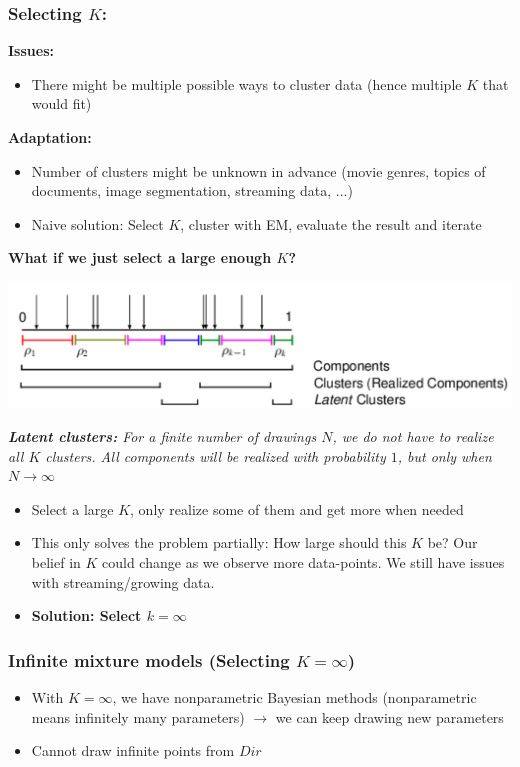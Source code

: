 \subsubsection{Selecting $K$: }
\textbf{Issues: }
\begin{itemize}
	\item There might be multiple possible ways to cluster data (hence multiple $K$ that would fit)
\end{itemize}

\textbf{Adaptation: }
\begin{itemize}
	\item Number of clusters might be unknown in advance (movie genres, topics of documents, image segmentation, streaming data, ...)
	\item Naive solution: Select $K$, cluster with EM, evaluate the result and iterate
\end{itemize}

\textbf{What if we just select a large enough $K$? }

\begin{minipage}{\columnwidth}
	\begin{center}
		\includegraphics[width=\columnwidth]{images/12b-latent-clusters}
	\end{center}
	\textit{\textbf{Latent clusters: }For a finite number of drawings $N$, we do not have to realize all $K$ clusters. All components will be realized with probability $1$, but only when $N\to\infty$}
\end{minipage}

\begin{itemize}
	\item Select a large $K$, only realize some of them and get more when needed
	\item This only solves the problem partially: How large should this $K$ be? Our belief in $K$ could change as we observe more data-points. We still have issues with streaming/growing data.
	\item \textbf{Solution: Select $k=\infty$}
\end{itemize}

\subsubsection{Infinite mixture models (Selecting $K=\infty$)}
\begin{itemize}
	\item With $K=\infty$, we have nonparametric Bayesian methods (nonparametric means infinitely many parameters) $\to$ we can keep drawing new parameters
	\item Cannot draw infinite points from $\mathit{Dir}$
\end{itemize}





